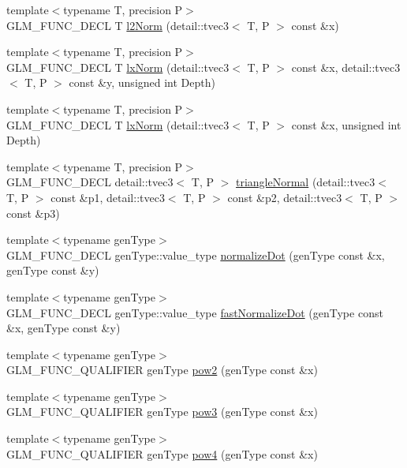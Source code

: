 \begin{CompactItemize}
\item 
{\footnotesize template$<$typename T, precision P$>$ }\\GLM\_\-FUNC\_\-DECL T \hyperlink{group__gtx__norm_g17bb46915f9694cbae612a7bae4c5116}{l2Norm} (detail::tvec3$<$ T, P $>$ const \&x)
\item 
{\footnotesize template$<$typename T, precision P$>$ }\\GLM\_\-FUNC\_\-DECL T \hyperlink{group__gtx__norm_g2f42190c8743abab279d0a8f5a321692}{lxNorm} (detail::tvec3$<$ T, P $>$ const \&x, detail::tvec3$<$ T, P $>$ const \&y, unsigned int Depth)
\item 
{\footnotesize template$<$typename T, precision P$>$ }\\GLM\_\-FUNC\_\-DECL T \hyperlink{group__gtx__norm_g955869c61ab902e4e3cf061303efdaef}{lxNorm} (detail::tvec3$<$ T, P $>$ const \&x, unsigned int Depth)
\item 
{\footnotesize template$<$typename T, precision P$>$ }\\GLM\_\-FUNC\_\-DECL detail::tvec3$<$ T, P $>$ \hyperlink{group__gtx__normal_g008775be02f71e8673a58e34acbb9a69}{triangleNormal} (detail::tvec3$<$ T, P $>$ const \&p1, detail::tvec3$<$ T, P $>$ const \&p2, detail::tvec3$<$ T, P $>$ const \&p3)
\item 
{\footnotesize template$<$typename genType$>$ }\\GLM\_\-FUNC\_\-DECL genType::value\_\-type \hyperlink{group__gtx__normalize__dot_g068b0c92713a438533628dd5d0b581d4}{normalizeDot} (genType const \&x, genType const \&y)
\item 
{\footnotesize template$<$typename genType$>$ }\\GLM\_\-FUNC\_\-DECL genType::value\_\-type \hyperlink{group__gtx__normalize__dot_gb3967681366216d96699232dd5e86d31}{fastNormalizeDot} (genType const \&x, genType const \&y)
\item 
{\footnotesize template$<$typename genType$>$ }\\GLM\_\-FUNC\_\-QUALIFIER genType \hyperlink{group__gtx__optimum__pow_g8c44a36cd695f8abc2444152606f6067}{pow2} (genType const \&x)
\item 
{\footnotesize template$<$typename genType$>$ }\\GLM\_\-FUNC\_\-QUALIFIER genType \hyperlink{group__gtx__optimum__pow_gc304ffcd456eeb248c1a3820cd9d7784}{pow3} (genType const \&x)
\item 
{\footnotesize template$<$typename genType$>$ }\\GLM\_\-FUNC\_\-QUALIFIER genType \hyperlink{group__gtx__optimum__pow_g829e48dc50a8db13c225cef2aa618839}{pow4} (genType const \&x)

\end{CompactItemize}
